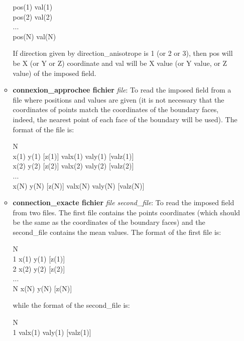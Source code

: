 \begin{itemize}
\begin{itemize}
\begin{center}
pos(1) val(1) \\
pos(2) val(2) \\
... \\
pos(N) val(N) \\
\end{center}
%
If direction given by direction\_anisotrope is 1 (or 2 or 3), then pos will be X (or Y or Z) coordinate and val will be X value (or Y value, or Z value) of the imposed field.
%
\item[] \textbf{connexion\_approchee fichier} \textit{file}: To read the imposed field from a file where positions and values are given (it is not necessary that the coordinates of points match the coordinates of the boundary faces, indeed, the nearest point of each face of the boundary will be used). The format of the file is:
\begin{center}
\hspace{-6cm} N \\
\hspace{-0.6cm} x(1) y(1) [z(1)] valx(1) valy(1) [valz(1)] \\
\hspace{-0.5cm}x(2) y(2) [z(2)] valx(2) valy(2) [valz(2)] \\
\hspace{-5.8cm} ... \\
x(N) y(N) [z(N)] valx(N) valy(N) [valz(N)]
\end{center}
%
\item[] \textbf{connection\_exacte fichier} \textit{file second\_file}: To read the imposed field from two files. The first file contains the points coordinates (which should be the same as the coordinates of the boundary faces) and the second\_file contains the mean values. The format of the first file is:
\begin{center}
	\hspace{-2.6cm} N \\
	\hspace{-0.5cm} 1 x(1) y(1) [z(1)] \\
	\hspace{-0.5cm}  2 x(2) y(2) [z(2)] \\
    \hspace{-2.5cm} ... \\
    N x(N) y(N) [z(N)]
\end{center}
    while the format of the second\_file is:
\begin{center}
    \hspace{-3.7cm} N \\
	\hspace{-0.3cm} 1 valx(1) valy(1) [valz(1)] \\

\end{center}
\end{itemize}
\end{itemize}
